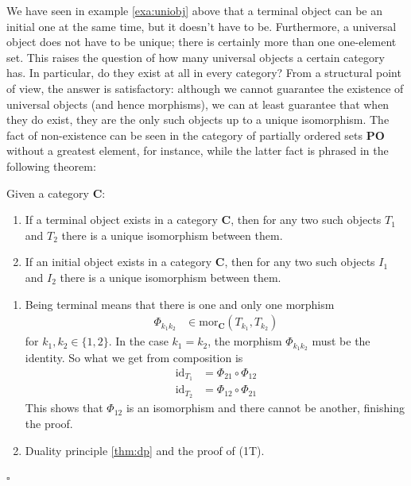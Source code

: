We have seen in example \ref{exa:uniobj} above that a terminal object can be an initial one at the same time, but it doesn't have to be.
Furthermore, a universal object does not have to be unique; there is certainly more than one one-element set.
This raises the question of how many universal objects a certain category has.
In particular, do they exist at all in every category? From a structural point of view, the answer is satisfactory: although we cannot guarantee the existence of universal objects (and hence morphisms), we can at least guarantee that when they do exist, they are the only such objects up to a unique isomorphism.
The fact of non-existence can be seen in the category of partially ordered sets $\mathbf{PO}$ without a greatest element, for instance, while the latter fact is phrased in the following theorem:
\\
\begin{thm}
\label{thm:uniqueuniarr}
Given a category $\mathbf{C}$:
\begin{enumerate}
\item[(1T)]
If a terminal object exists in a category $\mathbf{C}$, then for any two such objects $T_{1}$ and $T_{2}$ there is a unique isomorphism between them.
\item[(1I)]
If an initial object exists in a category $\mathbf{C}$, then for any two such objects $I_{1}$ and $I_{2}$ there is a unique isomorphism between them.
\end{enumerate}
\end{thm}
\begin{prf}
\begin{enumerate}
\item[(1T)]
Being terminal means that there is one and only one morphism
\begin{align*}
  \Phi_{k_{1}k_{2}}
  &\in
  \mathrm{mor}_{\mathbf{C}}(T_{k_{1}},T_{k_{2}})
\end{align*}
for $k_{1},k_{2} \in \lbrace 1,2 \rbrace$.
In the case $k_{1} = k_{2}$, the morphism $\Phi_{k_{1}k_{2}}$ must be the identity.
So what we get from composition is
\begin{align*}
  \mathrm{id}_{T_{1}}
  &=
  \Phi_{21}
  \circ
  \Phi_{12}
  \\
  \mathrm{id}_{T_{2}}
  &=
  \Phi_{12}
  \circ
  \Phi_{21}
\end{align*}
This shows that $\Phi_{12}$ is an isomorphism and there cannot be another, finishing the proof.
\item[(1I)]
Duality principle \ref{thm:dp} and the proof of (1T).
\end{enumerate}
\phantom{proven}
\hfill
$\square$
\end{prf}
